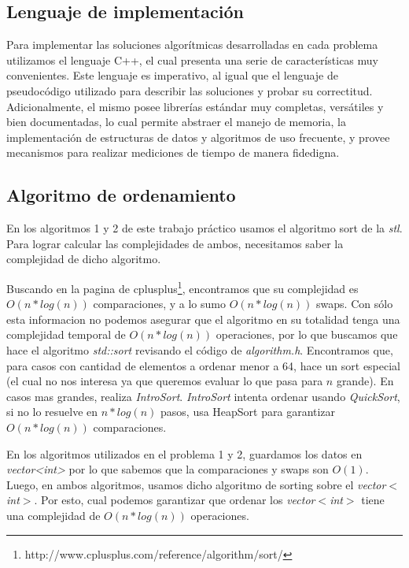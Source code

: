 \subsection{Lenguaje de implementación}

Para implementar las soluciones algorítmicas desarrolladas en cada problema utilizamos el lenguaje C++, el cual presenta una serie de características muy convenientes. Este lenguaje es imperativo, al igual que el lenguaje de pseudocódigo utilizado para describir las soluciones y probar su correctitud. Adicionalmente, el mismo posee librerías estándar muy completas, versátiles y bien documentadas, lo cual permite abstraer el manejo de memoria, la implementación de estructuras de datos y algoritmos de uso frecuente, y provee mecanismos para realizar mediciones de tiempo de manera fidedigna.

\subsection{Algoritmo de ordenamiento}

En los algoritmos 1 y 2 de este trabajo práctico usamos el algoritmo sort de la \emph{stl}. Para lograr calcular las complejidades de ambos, necesitamos saber la complejidad de dicho algoritmo.

Buscando en la pagina de cplusplus\footnote{http://www.cplusplus.com/reference/algorithm/sort/}, encontramos que su complejidad es $O(n*log (n))$  comparaciones, y a lo sumo $O(n*log (n))$ swaps. Con sólo esta informacion no podemos asegurar que el algoritmo en su totalidad tenga una complejidad temporal de $O(n*log (n))$  operaciones, por lo que buscamos que hace el algoritmo \emph{std::sort} revisando el código de \emph{algorithm.h}. Encontramos que, para casos con cantidad de elementos a ordenar menor a 64, hace un sort especial (el cual no nos interesa ya que queremos evaluar lo que pasa para $n$ grande). En casos mas grandes, realiza \emph{IntroSort}. \emph{IntroSort} intenta ordenar usando \emph{QuickSort}, si no lo resuelve en $n*log (n)$ pasos, usa HeapSort para garantizar $O(n*log (n))$ comparaciones.

En los algoritmos utilizados en el problema 1 y 2, guardamos los datos en \emph{vector<int>} por lo que sabemos que la comparaciones y swaps son $O(1)$. Luego, en ambos algoritmos, usamos dicho algoritmo de sorting sobre el  \emph{vector$<$int$>$}. Por esto, cual podemos garantizar que ordenar los \emph{vector$<$int$>$} tiene una complejidad de $O(n*log (n))$ operaciones.

